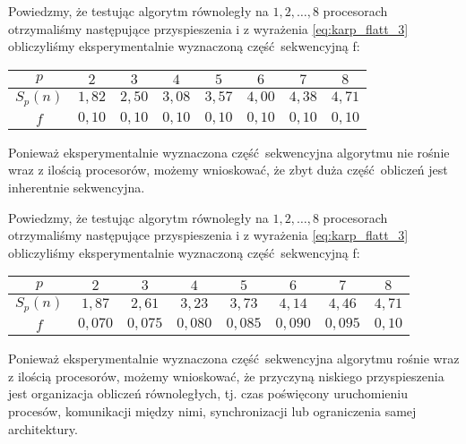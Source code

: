\begin{przyklad}
Powiedzmy, że testując algorytm równoległy na \(1, 2, \dots, 8\) procesorach otrzymaliśmy następujące przyspieszenia i z wyrażenia \ref{eq:karp_flatt_3} obliczyliśmy eksperymentalnie wyznaczoną część sekwencyjną f:
\begin{tabular}{|c|c|c|c|c|c|c|c|}
\hline
\(p\) & \(2\) & \(3\) & \(4\) & \(5\) & \(6\) & \(7\) & \(8\) \\

\hline
\(S_p(n)\) & \(1,82\) & \(2,50\) & \(3,08\) & \(3,57\) & \(4,00\) & \(4,38\) & \(4,71\) \\
\hline
\(f\) & \(0,10\) & \(0,10\) & \(0,10\) & \(0,10\) & \(0,10\) & \(0,10\) & \(0,10\) \\
\hline
\end{tabular}
Ponieważ eksperymentalnie wyznaczona część sekwencyjna algorytmu nie rośnie wraz z ilością procesorów, możemy wnioskować, że zbyt duża część obliczeń jest inherentnie sekwencyjna.
\end{przyklad}

\begin{przyklad}
Powiedzmy, że testując algorytm równoległy na \(1, 2, \dots, 8\) procesorach otrzymaliśmy następujące przyspieszenia i z wyrażenia \ref{eq:karp_flatt_3} obliczyliśmy eksperymentalnie wyznaczoną część sekwencyjną f:
\begin{tabular}{|c|c|c|c|c|c|c|c|}
\hline
\(p\) & \(2\) & \(3\) & \(4\) & \(5\) & \(6\) & \(7\) & \(8\) \\
\hline
\(S_p(n)\) & \(1,87\) & \(2,61\) & \(3,23\) & \(3,73\) & \(4,14\) & \(4,46\) & \(4,71\) \\
\hline
\(f\) & \(0,070\) & \(0,075\) & \(0,080\) & \(0,085\) & \(0,090\) & \(0,095\) & \(0,10\) \\
\hline
\end{tabular}
Ponieważ eksperymentalnie wyznaczona część sekwencyjna algorytmu rośnie wraz z ilością procesorów, możemy wnioskować, że przyczyną niskiego przyspieszenia jest organizacja obliczeń równoległych, tj. czas poświęcony uruchomieniu procesów, komunikacji między nimi, synchronizacji lub ograniczenia samej architektury.
\end{przyklad}